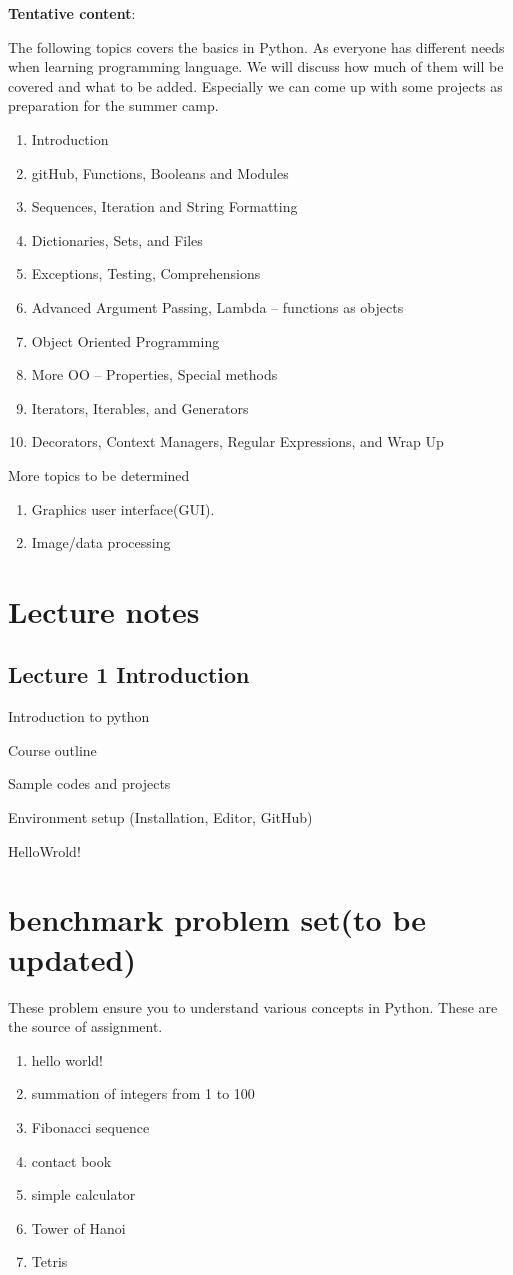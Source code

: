 \documentclass[aps,prb,12pt,tightenlines,%
notitlepage,longbibliography]{revtex4-1}
\begin{document}
\textbf{Tentative content}:

The following topics covers the basics in Python.
As everyone has
different needs when learning programming language. We will discuss
how much of them will be covered and what to be added. Especially we
can come up with some projects as preparation for the summer camp.

\begin{enumerate}

\item  Introduction
\item   gitHub, Functions, Booleans and Modules
\item   Sequences, Iteration and String Formatting
\item   Dictionaries, Sets, and Files
\item   Exceptions, Testing, Comprehensions
\item   Advanced Argument Passing, Lambda -- functions as objects
\item   Object Oriented Programming
\item   More OO -- Properties, Special methods
\item  Iterators, Iterables, and Generators
\item   Decorators, Context Managers, Regular Expressions, and Wrap Up
  
\end{enumerate}

More topics to be determined
\begin{enumerate}
\item
  Graphics user interface(GUI).
\item
  Image/data processing

  \end{enumerate}


\section{Lecture notes}
\subsection{Lecture 1 Introduction}
Introduction to python

Course outline

Sample codes and projects

Environment setup (Installation, Editor, GitHub)

HelloWrold!

\section{benchmark problem set(to be updated)}
These problem ensure you to understand various concepts in
Python. These are the source of assignment.

\begin{enumerate}
\item hello world!
\item summation of integers from 1 to 100
\item Fibonacci sequence
\item contact book
\item simple calculator
\item Tower of Hanoi
\item Tetris  

\end{enumerate}
  


\end{document}
